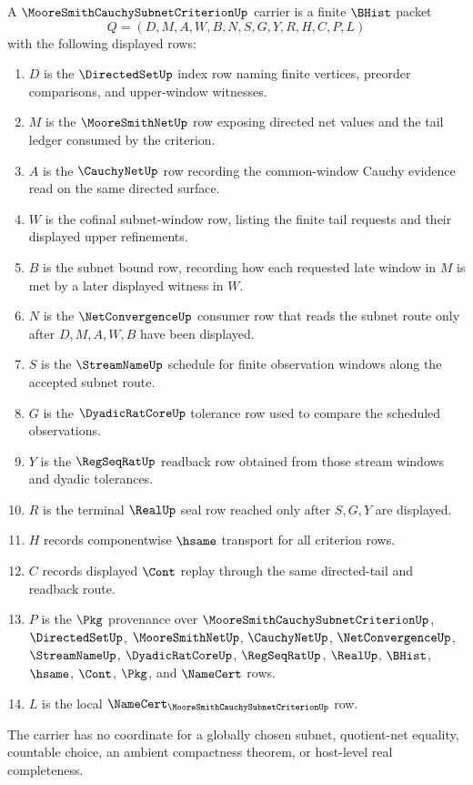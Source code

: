 \begin{definition}
\label{def:moore-smith-cauchy-subnet-criterion-carrier}
A $\MooreSmithCauchySubnetCriterionUp$ carrier is a finite $\BHist$ packet
$$
Q=(D,M,A,W,B,N,S,G,Y,R,H,C,P,L)
$$
with the following displayed rows:
\begin{enumerate}
\item $D$ is the $\DirectedSetUp$ index row naming finite vertices, preorder comparisons, and upper-window witnesses.
\item $M$ is the $\MooreSmithNetUp$ row exposing directed net values and the tail ledger consumed by the criterion.
\item $A$ is the $\CauchyNetUp$ row recording the common-window Cauchy evidence read on the same directed surface.
\item $W$ is the cofinal subnet-window row, listing the finite tail requests and their displayed upper refinements.
\item $B$ is the subnet bound row, recording how each requested late window in $M$ is met by a later displayed witness in $W$.
\item $N$ is the $\NetConvergenceUp$ consumer row that reads the subnet route only after $D,M,A,W,B$ have been displayed.
\item $S$ is the $\StreamNameUp$ schedule for finite observation windows along the accepted subnet route.
\item $G$ is the $\DyadicRatCoreUp$ tolerance row used to compare the scheduled observations.
\item $Y$ is the $\RegSeqRatUp$ readback row obtained from those stream windows and dyadic tolerances.
\item $R$ is the terminal $\RealUp$ seal row reached only after $S,G,Y$ are displayed.
\item $H$ records componentwise $\hsame$ transport for all criterion rows.
\item $C$ records displayed $\Cont$ replay through the same directed-tail and readback route.
\item $P$ is the $\Pkg$ provenance over $\MooreSmithCauchySubnetCriterionUp$, $\DirectedSetUp$, $\MooreSmithNetUp$, $\CauchyNetUp$, $\NetConvergenceUp$, $\StreamNameUp$, $\DyadicRatCoreUp$, $\RegSeqRatUp$, $\RealUp$, $\BHist$, $\hsame$, $\Cont$, $\Pkg$, and $\NameCert$ rows.
\item $L$ is the local $\NameCert_{\MooreSmithCauchySubnetCriterionUp}$ row.
\end{enumerate}
The carrier has no coordinate for a globally chosen subnet, quotient-net equality, countable choice, an ambient compactness theorem, or host-level real completeness.
\end{definition}

